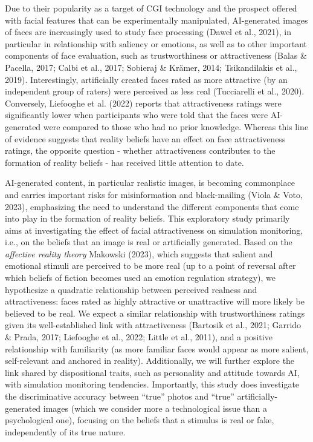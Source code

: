 \documentclass[
  man,floatsintext]{apa6}
\begin{document}
Due to their popularity as a target of CGI technology and the prospect offered with facial features that can be experimentally manipulated, AI-generated images of faces are increasingly used to study face processing (Dawel et al., 2021), in particular in relationship with saliency or emotions, as well as to other important components of face evaluation, such as trustworthiness or attractiveness (Balas \& Pacella, 2017; Calbi et al., 2017; Sobieraj \& Krämer, 2014; Tsikandilakis et al., 2019). Interestingly, artificially created faces rated as more attractive (by an independent group of raters) were perceived as less real (Tucciarelli et al., 2020). Conversely, Liefooghe et al. (2022) reports that attractiveness ratings were significantly lower when participants who were told that the faces were AI-generated were compared to those who had no prior knowledge. Whereas this line of evidence suggests that reality beliefs have an effect on face attractiveness ratings, the opposite question - whether attractiveness contributes to the formation of reality beliefs - has received little attention to date.

AI-generated content, in particular realistic images, is becoming commonplace and carries important risks for misinformation and black-mailing (Viola \& Voto, 2023), emphasizing the need to understand the different components that come into play in the formation of reality beliefs.
This exploratory study primarily aims at investigating the effect of facial attractiveness on simulation monitoring, i.e., on the beliefs that an image is real or artificially generated. Based on the \emph{affective reality theory}
Makowski (2023),
which suggests that salient and emotional stimuli are perceived to be more real (up to a point of reversal after which beliefs of fiction becomes used an emotion regulation strategy), we hypothesize a quadratic relationship between perceived realness and attractiveness: faces rated as highly attractive or unattractive will more likely be believed to be real. We expect a similar relationship with trustworthiness ratings given its well-established link with attractiveness (Bartosik et al., 2021; Garrido \& Prada, 2017; Liefooghe et al., 2022; Little et al., 2011), and a positive relationship with familiarity (as more familiar faces would appear as more salient, self-relevant and anchored in reality). Additionally, we will further explore the link shared by dispositional traits, such as personality and attitude towards AI, with simulation monitoring tendencies. Importantly, this study does investigate the discriminative accuracy between ``true'' photos and ``true'' artificially-generated images (which we consider more a technological issue than a psychological one), focusing on the beliefs that a stimulus is real or fake, independently of its true nature.
\end{document}
